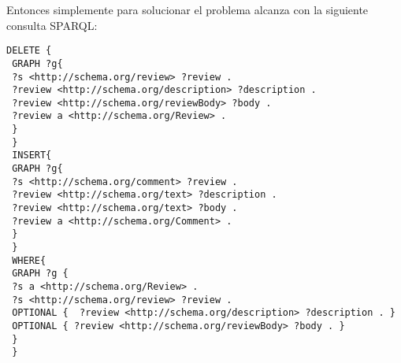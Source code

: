 Entonces simplemente para solucionar el problema alcanza con la siguiente consulta SPARQL:\\
\begin{lstlisting}[frame=single]
 DELETE { 
 GRAPH ?g{ 
 ?s <http://schema.org/review> ?review .
 ?review <http://schema.org/description> ?description .
 ?review <http://schema.org/reviewBody> ?body .
 ?review a <http://schema.org/Review> .
 } 
 } 
 INSERT{ 
 GRAPH ?g{ 
 ?s <http://schema.org/comment> ?review .
 ?review <http://schema.org/text> ?description .
 ?review <http://schema.org/text> ?body .
 ?review a <http://schema.org/Comment> .
 }
 }
 WHERE{
 GRAPH ?g {
 ?s a <http://schema.org/Review> .
 ?s <http://schema.org/review> ?review .
 OPTIONAL {  ?review <http://schema.org/description> ?description . }
 OPTIONAL { ?review <http://schema.org/reviewBody> ?body . }
 }
 }
\end{lstlisting}\\